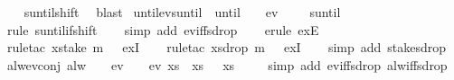 \begin{isabellebody}
%
\isadelimproof
\ \ %
\endisadelimproof
%
\isatagproof
{}\isamarkupfalse%
\ suntil{\isacharunderscore}shift\ \isamarkupfalse%
\ blast%
\endisatagproof
{\isafoldproof}%
%
\isadelimproof
\isanewline
%
\endisadelimproof
\isanewline
{}\isamarkupfalse%
\ until{\isacharunderscore}ev{\isacharunderscore}suntil{\isacharcolon}\ {\isachardoublequoteopen}{\isacharparenleft}{\isasymphi}\ until\ {\isasympsi}{\isacharparenright}\ {\isasymomega}\ {\isasymLongrightarrow}\ ev\ {\isasympsi}\ {\isasymomega}\ {\isasymLongrightarrow}\ {\isacharparenleft}{\isasymphi}\ suntil\ {\isasympsi}{\isacharparenright}\ {\isasymomega}{\isachardoublequoteclose}\isanewline
%
\isadelimproof
\ \ %
\endisadelimproof
%
\isatagproof
{}\isamarkupfalse%
\ {\isacharparenleft}rule\ suntil{\isacharunderscore}if{\isacharunderscore}shift{\isacharparenright}\isanewline
\ \ \isamarkupfalse%
\ {\isacharparenleft}simp\ add{\isacharcolon}\ ev{\isacharunderscore}iff{\isacharunderscore}sdrop{\isacharparenright}\isanewline
\ \ \isamarkupfalse%
\ {\isacharparenleft}erule\ exE{\isacharparenright}\isanewline
\ \ \isamarkupfalse%
\ {\isacharparenleft}rule{\isacharunderscore}tac\ x{\isacharequal}{\isachardoublequoteopen}stake\ m\ {\isasymomega}{\isachardoublequoteclose}\ \ exI{\isacharparenright}\isanewline
\ \ \isamarkupfalse%
\ {\isacharparenleft}rule{\isacharunderscore}tac\ x{\isacharequal}{\isachardoublequoteopen}sdrop\ m\ {\isasymomega}{\isachardoublequoteclose}\ \ exI{\isacharparenright}\isanewline
\ \ \isamarkupfalse%
\ {\isacharparenleft}simp\ add{\isacharcolon}\ stake{\isacharunderscore}sdrop{\isacharparenright}%
\endisatagproof
{\isafoldproof}%
%
\isadelimproof
\isanewline
%
\endisadelimproof
\isanewline
{}\isamarkupfalse%
\ alw{\isacharunderscore}ev{\isacharunderscore}conj{\isacharcolon}\ {\isachardoublequoteopen}alw\ {\isasympsi}\ {\isasymomega}\ {\isasymLongrightarrow}\ ev\ {\isasymphi}\ {\isasymomega}\ {\isasymLongrightarrow}\ ev\ {\isacharparenleft}{\isasymlambda}xs{\isachardot}\ {\isasymphi}\ xs\ {\isasymand}\ {\isasympsi}\ xs{\isacharparenright}\ {\isasymomega}{\isachardoublequoteclose}\isanewline
%
\isadelimproof
\ \ %
\endisadelimproof
%
\isatagproof
{}\isamarkupfalse%
\ {\isacharparenleft}simp\ add{\isacharcolon}\ ev{\isacharunderscore}iff{\isacharunderscore}sdrop\ alw{\isacharunderscore}iff{\isacharunderscore}sdrop{\isacharparenright}%
\endisatagproof
{\isafoldproof}%
%
\isadelimproof
\isanewline

\end{isabellebody}

